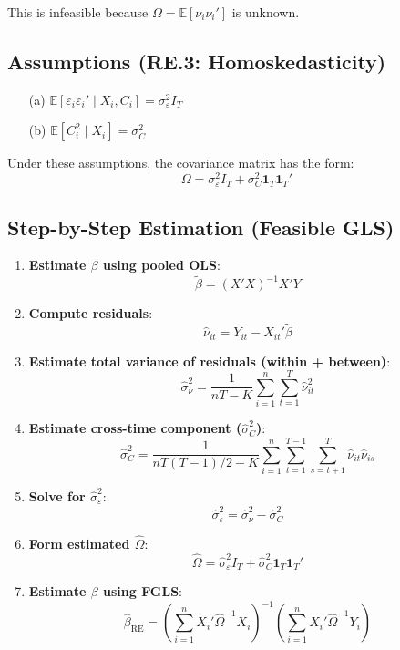 \documentclass[12pt, oneside]{article}
\begin{document}
This is infeasible because \( \Omega = \mathbb{E}[\nu_i \nu_i'] \) is unknown.

\subsection*{Assumptions (RE.3: Homoskedasticity)}

\begin{itemize}
    \item[(a)] \( \mathbb{E}[\varepsilon_i \varepsilon_i' \mid X_i, C_i] = \sigma_\varepsilon^2 I_T \)
    \item[(b)] \( \mathbb{E}[C_i^2 \mid X_i] = \sigma_C^2 \)
\end{itemize}

Under these assumptions, the covariance matrix has the form:
\[
\Omega = \sigma_\varepsilon^2 I_T + \sigma_C^2 \bm{1}_T \bm{1}_T'
\]

\subsection*{Step-by-Step Estimation (Feasible GLS)}

\begin{enumerate}
    \item \textbf{Estimate \( \beta \) using pooled OLS}:
    \[
    \tilde{\beta} = (X'X)^{-1} X'Y
    \]

    \item \textbf{Compute residuals}:
    \[
    \hat{\nu}_{it} = Y_{it} - X_{it}' \tilde{\beta}
    \]

    \item \textbf{Estimate total variance of residuals (within + between)}:
    \[
    \hat{\sigma}_\nu^2 = \frac{1}{nT - K} \sum_{i=1}^n \sum_{t=1}^T \hat{\nu}_{it}^2
    \]

    \item \textbf{Estimate cross-time component (\( \hat{\sigma}_C^2 \))}:
    \[
    \hat{\sigma}_C^2 = \frac{1}{nT(T-1)/2 - K} \sum_{i=1}^n \sum_{t=1}^{T-1} \sum_{s = t+1}^T \hat{\nu}_{it} \hat{\nu}_{is}
    \]

    \item \textbf{Solve for \( \hat{\sigma}_\varepsilon^2 \)}:
    \[
    \hat{\sigma}_\varepsilon^2 = \hat{\sigma}_\nu^2 - \hat{\sigma}_C^2
    \]

    \item \textbf{Form estimated \( \hat{\Omega} \)}:
    \[
    \hat{\Omega} = \hat{\sigma}_\varepsilon^2 I_T + \hat{\sigma}_C^2 \bm{1}_T \bm{1}_T'
    \]

    \item \textbf{Estimate \( \beta \) using FGLS}:
    \[
    \hat{\beta}_{\text{RE}} = \left( \sum_{i=1}^n X_i' \hat{\Omega}^{-1} X_i \right)^{-1} \left( \sum_{i=1}^n X_i' \hat{\Omega}^{-1} Y_i \right)
    \]
\end{enumerate}
\end{document}
